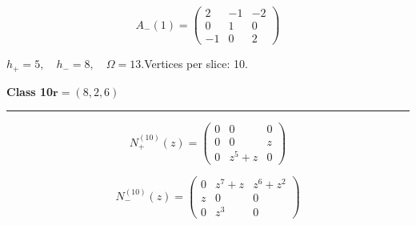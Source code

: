 \begin{minipage}{\linewidth}
\begin{minipage}[c]{0.495\linewidth}
\setlength{\abovedisplayskip}{3pt}\setlength{\belowdisplayskip}{3pt}
\setlength{\abovedisplayshortskip}{3pt}\setlength{\belowdisplayshortskip}{3pt}
\setlength{\arraycolsep}{3.5pt}\renewcommand{\arraystretch}{1.18}
\[A_{-}(1)=\begin{pmatrix}2 & -1 & -2\\0 & 1 & 0\\-1 & 0 & 2\end{pmatrix}\]
\end{minipage}%
\par\smallskip\noindent\small $h_+=5,\quad h_-=8,\quad \Omega=13.$\quad Vertices per slice: 10.
\end{minipage}\par\vfill
\noindent\begin{minipage}{\linewidth}
\noindent\textbf{Class 10}\hfill $\symbf{r}=(8,2,6)$
\par\smallskip\noindent\textcolor{rulegray}{\rule{\linewidth}{0.3pt}}
\begin{minipage}[c]{0.495\linewidth}\centering\fontsize{10.5}{13}\selectfont
\setlength{\abovedisplayskip}{3pt}\setlength{\belowdisplayskip}{3pt}
\setlength{\abovedisplayshortskip}{3pt}\setlength{\belowdisplayshortskip}{3pt}
\setlength{\arraycolsep}{3.5pt}\renewcommand{\arraystretch}{1.18}
\[N_{+}^{(10)}(z)=\begin{pmatrix}0 & 0 & 0\\0 & 0 & z\\0 & z^{5} + z & 0\end{pmatrix}\]
\end{minipage}%
\begin{minipage}[c]{0.495\linewidth}\centering\fontsize{10.5}{13}\selectfont
\setlength{\abovedisplayskip}{3pt}\setlength{\belowdisplayskip}{3pt}
\setlength{\abovedisplayshortskip}{3pt}\setlength{\belowdisplayshortskip}{3pt}
\setlength{\arraycolsep}{3.5pt}\renewcommand{\arraystretch}{1.18}
\[N_{-}^{(10)}(z)=\begin{pmatrix}0 & z^{7} + z & z^{6} + z^{2}\\z & 0 & 0\\0 & z^{3} & 0\end{pmatrix}\]
\end{minipage}%
\par\noindent
\begin{minipage}[c]{0.495\linewidth}\centering\fontsize{10.5}{13}\selectfont
\setlength{\abovedisplayskip}{3pt}\setlength{\belowdisplayskip}{3pt}
\setlength{\abovedisplayshortskip}{3pt}\setlength{\belowdisplayshortskip}{3pt}
\setlength{\arraycolsep}{3.5pt}\renewcommand{\arraystretch}{1.18}

\end{minipage}
\end{minipage}
